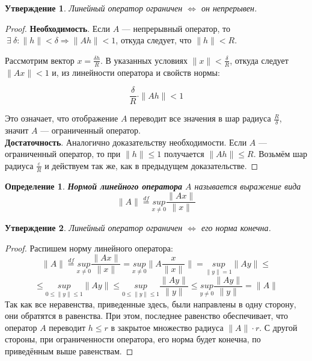 \documentclass[12pt]{article}
\let\existstemp\exists
\renewcommand{\exists}{\: \existstemp \:}
\newcommand{\equals}{\Leftrightarrow}
\newcommand{\norm}[1]{\| #1 \|}
\renewcommand{\leq}{\leqslant}
\newtheorem{defi}{Определение}[section]
\newtheorem{state}{Утверждение}[section] %
\begin{document}
	\begin{state}
		Линейный оператор ограничен $\equals$ он непрерывен.
	\end{state}
	\begin{proof}
		\textbf{Необходимость}. Если $A$ --- непрерывный оператор, то 
		$ \exists \delta : \norm{h} < \delta \Rightarrow \norm{Ah} < 1 $,
		откуда следует, что $\norm{h} < R$. 
		
		Рассмотрим вектор $x = \frac{\delta h}{R}$. В указанных условиях
		$\norm{x} < \frac{\delta}{R}$, откуда следует $\norm{Ax} < 1$ и, из линейности оператора и свойств нормы:

		$$\frac{\delta}{R} \cdot \norm {Ah} < 1$$
		
		Это означает, что отображение $A$ переводит все значения в шар радиуса $\frac{R}{\delta}$, значит
		$A$ --- ограниченный оператор. \\
		
		\textbf{Достаточность}. Аналогично доказательству необходимости. Если $A$ --- ограниченный оператор,
		то при $\norm{h} \leq 1$ получается $\norm{Ah} \leq R$. Возьмём шар радиуса $\frac{\varepsilon}{R}$
		и действуем так же, как в предыдущем доказательстве.
	\end{proof}
	
	\begin{defi}
		\textbf{Нормой линейного оператора} $A$ называется выражение вида 
		$$\norm{A} \overset{df}{=} \underset{x \neq 0}{sup} \frac{\norm{Ax}}{\norm{x}}$$
	\end{defi}
	
	\begin{state}
		Линейный оператор ограничен $\equals$ его норма конечна.
	\end{state}
	\begin{proof}
		Распишем норму линейного оператора:
		$$
			\norm{A} \overset{df}{=} \underset{x \neq 0}{sup} \frac{\norm{Ax}}{\norm{x}} = 
			\underset{x \neq 0}{sup} \norm{A \frac{x}{\norm{x}}} =
			\underset{\norm{y} = 1}{sup} \norm{Ay} \leq
		$$
		$$
			\leq
			\underset{0 \leq \norm{y} \leq 1}{sup} \norm{Ay} \leq
			\underset{0 \leq \norm{y} \leq 1}{sup} \frac{\norm{Ay}}{\norm{y}} \leq
			\underset{y \neq 0}{sup} \frac{\norm{Ay}}{\norm{y}} =
			\norm{A}
		$$
		Так как все неравенства, приведенные здесь, были направлены в одну сторону,
		они обратятся в равенства. При этом, последнее равенство обеспечивает, что
		оператор $A$ переводит $h \leq r$ в закрытое множество радиуса $\norm{A} \cdot r$.
		С другой стороны, при ограниченности оператора, его норма будет конечна, по приведённым
		выше равенствам.
	\end{proof}
	
\end{document}
